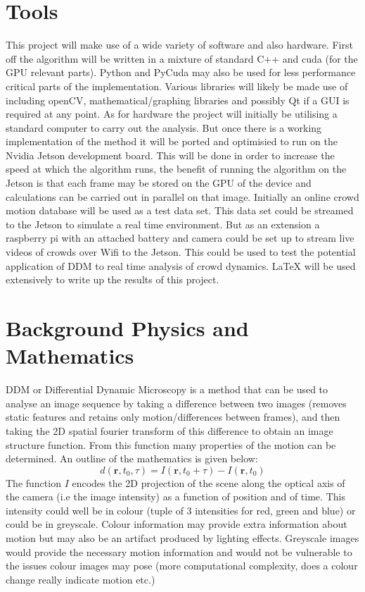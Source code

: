 \documentclass[11pt]{article}
\begin{document}
\section{Tools}
This project will make use of a wide variety of software and also hardware.
First off the algorithm will be written in a mixture of standard C++ and cuda (for the GPU relevant parts).
Python and PyCuda may also be used for less performance critical parts of the implementation.
Various libraries will likely be made use of including openCV, mathematical/graphing libraries and possibly Qt if a GUI is required at any point.
As for hardware the project will initially be utilising a standard computer to carry out the analysis.
But once there is a working implementation of the method it will be ported and optimisied to run on the Nvidia Jetson development board.
This will be done in order to increase the speed at which the algorithm runs, the benefit of running the algorithm on the Jetson
is that each frame may be stored on the GPU of the device and calculations can be carried out in parallel on that image.
Initially an online crowd motion database will be used as a test data set.\cite{crowdMotionDB}
This data set could be streamed to the Jetson to simulate a real time environment.
But as an extension a raspberry pi with an attached battery and camera could be set up to stream live videos of crowds over Wifi to the Jetson.
This could be used to test the potential application of DDM to real time analysis of crowd dynamics.
LaTeX will be used extensively to write up the results of this project.

\section{Background Physics and Mathematics}
DDM or Differential Dynamic Microscopy is a method that can be used to analyse an image sequence by taking a difference between two images (removes static features and retains only motion/differences between frames),
and then taking the 2D spatial fourier transform of this difference to obtain an image structure function.
From this function many properties of the motion can be determined.\cite{ddm1}
An outline of the mathematics is given below:
\\
\begin{equation}
    d(\textbf{r}, t_0, \tau) = I(\mathbf{r}, t_0 + \tau) - I(\mathbf{r}, t_0)
\end{equation}
The function $\textit{I}$ encodes the 2D projection of the scene along the optical axis of the camera (i.e the image intensity) as a function of position and of time.
This intensity could well be in colour (tuple of 3 intensities for red, green and blue) or could be in greyscale.
Colour information may provide extra information about motion but may also be an artifact produced by lighting effects.
Greyscale images would provide the necessary motion information and would not be vulnerable to the issues colour images may pose (more computational complexity, does a colour change really indicate motion etc.)
\end{document}
